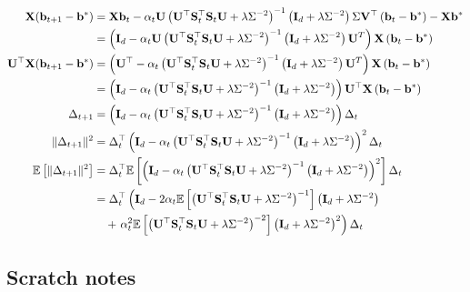 \documentclass[10pt]{article}
\begin{document}
\begin{align*}
\mathbf{X}(\mathbf{b}_{t+1}-\mathbf{b}^*) &= \mathbf{X}\mathbf{b}_t - \alpha_t\mathbf{U}\left(\mathbf{U}^\top\mathbf{S}_t^\top\mathbf{S}_t\mathbf{U} + \lambda\Sigma^{-2}\right)^{-1}\left(\mathbf{I}_d + \lambda\Sigma^{-2}\right)\Sigma\mathbf{V}^\top\left(\mathbf{b}_t-\mathbf{b}^*\right) - \mathbf{X}\mathbf{b}^* \\
&= \left(\mathbf{I}_d - \alpha_t\mathbf{U}\left(\mathbf{U}^\top\mathbf{S}_t^\top\mathbf{S}_t\mathbf{U} + \lambda\Sigma^{-2}\right)^{-1}\left(\mathbf{I}_d + \lambda\Sigma^{-2}\right)\mathbf{U}^T\right)\mathbf{X}\left(\mathbf{b}_t-\mathbf{b}^*\right) \\
\mathbf{U}^\top\mathbf{X}(\mathbf{b}_{t+1}-\mathbf{b}^*) &= \left(\mathbf{U}^\top - \alpha_t\left(\mathbf{U}^\top\mathbf{S}_t^\top\mathbf{S}_t\mathbf{U} + \lambda\Sigma^{-2}\right)^{-1}\left(\mathbf{I}_d + \lambda\Sigma^{-2}\right)\mathbf{U}^T\right)\mathbf{X}\left(\mathbf{b}_t-\mathbf{b}^*\right) \\
&= \left(\mathbf{I}_d - \alpha_t\left(\mathbf{U}^\top\mathbf{S}_t^\top\mathbf{S}_t\mathbf{U} + \lambda\Sigma^{-2}\right)^{-1}\left(\mathbf{I}_d + \lambda\Sigma^{-2}\right)\right)\mathbf{U}^\top\mathbf{X}\left(\mathbf{b}_t-\mathbf{b}^*\right) \\
\Delta_{t+1} &= \left(\mathbf{I}_d - \alpha_t\left(\mathbf{U}^\top\mathbf{S}_t^\top\mathbf{S}_t\mathbf{U} + \lambda\Sigma^{-2}\right)^{-1}\left(\mathbf{I}_d + \lambda\Sigma^{-2}\right)\right)\Delta_t \\
\|\Delta_{t+1}\|^2 &= \Delta_t^\top\left(\mathbf{I}_d - \alpha_t\left(\mathbf{U}^\top\mathbf{S}_t^\top\mathbf{S}_t\mathbf{U} + \lambda\Sigma^{-2}\right)^{-1}\left(\mathbf{I}_d + \lambda\Sigma^{-2}\right)\right)^2\Delta_t \\
\mathbb{E}\left[\|\Delta_{t+1}\|^2\right] &= \Delta_t^\top\mathbb{E}\left[\left(\mathbf{I}_d - \alpha_t\left(\mathbf{U}^\top\mathbf{S}_t^\top\mathbf{S}_t\mathbf{U} + \lambda\Sigma^{-2}\right)^{-1}\left(\mathbf{I}_d + \lambda\Sigma^{-2}\right)\right)^2\right]\Delta_t  \\
&= \Delta_t^\top\left(\mathbf{I}_d - 2\alpha_t\mathbb{E}\left[\left(\mathbf{U}^\top\mathbf{S}_t^\top\mathbf{S}_t\mathbf{U} + \lambda\Sigma^{-2}\right)^{-1}\right]\left(\mathbf{I}_d + \lambda\Sigma^{-2}\right) \right. \\
&\quad + \left. \alpha_t^2\mathbb{E}\left[\left(\mathbf{U}^\top\mathbf{S}_t^\top\mathbf{S}_t\mathbf{U} + \lambda\Sigma^{-2}\right)^{-2}\right]\left(\mathbf{I}_d + \lambda\Sigma^{-2}\right)^2\right)\Delta_t 
\end{align*}


\subsection{Scratch notes}
\end{document}
